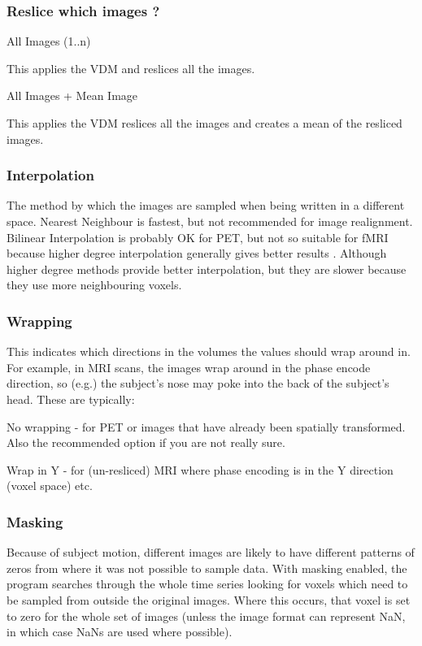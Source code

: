 \subsubsection{Reslice which images ?}
All Images (1..n) 

  This applies the VDM and reslices all the images. 

All Images + Mean Image 

   This applies the VDM reslices all the images and creates a mean of the resliced images.


\subsubsection{Interpolation}
The method by which the images are sampled when being written in a different space. Nearest Neighbour is fastest, but not recommended for image realignment. Bilinear Interpolation is probably OK for PET, but not so suitable for fMRI because higher degree interpolation generally gives better results \cite{thevenaz00a,unser93a,unser93b}. Although higher degree methods provide better interpolation, but they are slower because they use more neighbouring voxels.


\subsubsection{Wrapping}
This indicates which directions in the volumes the values should wrap around in.  For example, in MRI scans, the images wrap around in the phase encode direction, so (e.g.) the subject's nose may poke into the back of the subject's head. These are typically:

    No wrapping - for PET or images that have already                   been spatially transformed. Also the recommended option if                   you are not really sure.

    Wrap in  Y  - for (un-resliced) MRI where phase encoding                   is in the Y direction (voxel space) etc.


\subsubsection{Masking}
Because of subject motion, different images are likely to have different patterns of zeros from where it was not possible to sample data. With masking enabled, the program searches through the whole time series looking for voxels which need to be sampled from outside the original images. Where this occurs, that voxel is set to zero for the whole set of images (unless the image format can represent NaN, in which case NaNs are used where possible).


